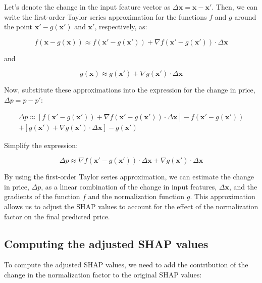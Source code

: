 \documentclass{article}
\begin{document}
Let's denote the change in the input feature vector as $\Delta \mathbf{x} = \mathbf{x} - \mathbf{x'}$. Then, we can write the first-order Taylor series approximation for the functions $f$ and $g$ around the point $\mathbf{x'} - g(\mathbf{x'})$ and $\mathbf{x'}$, respectively, as:

\begin{equation}
    f(\mathbf{x} - g(\mathbf{x})) \approx f(\mathbf{x'} - g(\mathbf{x'})) + \nabla f(\mathbf{x'} - g(\mathbf{x'})) \cdot \Delta \mathbf{x}
\end{equation}

and

\begin{equation}
    g(\mathbf{x}) \approx g(\mathbf{x'}) + \nabla g(\mathbf{x'}) \cdot \Delta \mathbf{x}
\end{equation}

Now, substitute these approximations into the expression for the change in price, $\Delta p = p - p'$:

\begin{equation}
    \begin{split}
        \Delta p \approx \left[ f(\mathbf{x'} - g(\mathbf{x'})) + \nabla f(\mathbf{x'} - g(\mathbf{x'})) \cdot \Delta \mathbf{x} \right] - f(\mathbf{x'} - g(\mathbf{x'})) \\
        + \left[ g(\mathbf{x'}) + \nabla g(\mathbf{x'}) \cdot \Delta \mathbf{x} \right] - g(\mathbf{x'})
    \end{split}
\end{equation}
 
Simplify the expression:

\begin{equation}
    \Delta p \approx \nabla f(\mathbf{x'} - g(\mathbf{x'})) \cdot \Delta \mathbf{x} + \nabla g(\mathbf{x'}) \cdot \Delta \mathbf{x}
\end{equation}

By using the first-order Taylor series approximation, we can estimate the change in price, $\Delta p$, as a linear combination of the change in input features, $\Delta \mathbf{x}$, and the gradients of the function $f$ and the normalization function $g$. This approximation allows us to adjust the SHAP values to account for the effect of the normalization factor on the final predicted price.

\subsection{Computing the adjusted SHAP values}
To compute the adjusted SHAP values, we need to add the contribution of the change in the normalization factor to the original SHAP values:
\end{document}
